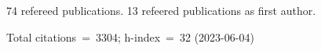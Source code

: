 74 refereed publications. 13 refeered publications as first author.

Total citations~=~3304; h-index~=~32 (2023-06-04)